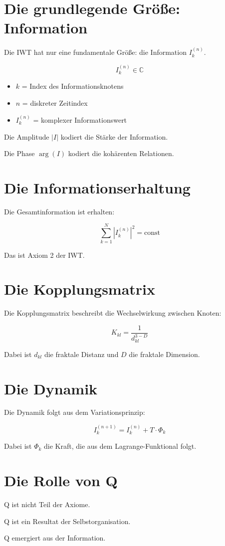 
\section{Die grundlegende Größe: Information}

Die IWT hat nur eine fundamentale Größe: die Information \( I_k^{(n)} \).

\[
I_k^{(n)} \in \mathbb{C}
\]

\begin{itemize}
    \item \( k \) = Index des Informationsknotens
    \item \( n \) = diskreter Zeitindex
    \item \( I_k^{(n)} \) = komplexer Informationswert
\end{itemize}

Die Amplitude \( |I| \) kodiert die Stärke der Information.

Die Phase \( \arg(I) \) kodiert die kohärenten Relationen.

\section{Die Informationserhaltung}

Die Gesamtinformation ist erhalten:

\[
\sum_{k=1}^{N} |I_k^{(n)}|^2 = \text{const}
\]

Das ist Axiom 2 der IWT.

\section{Die Kopplungsmatrix}

Die Kopplungsmatrix beschreibt die Wechselwirkung zwischen Knoten:

\[
K_{kl} = \frac{1}{d_{kl}^{3-D}}
\]

Dabei ist \( d_{kl} \) die fraktale Distanz und \( D \) die fraktale Dimension.

\section{Die Dynamik}

Die Dynamik folgt aus dem Variationsprinzip:

\[
I_k^{(n+1)} = I_k^{(n)} + T \cdot \Phi_k
\]

Dabei ist \( \Phi_k \) die Kraft, die aus dem Lagrange-Funktional folgt.

\section{Die Rolle von Q}

Q ist nicht Teil der Axiome.

Q ist ein Resultat der Selbstorganisation.

Q emergiert aus der Information.